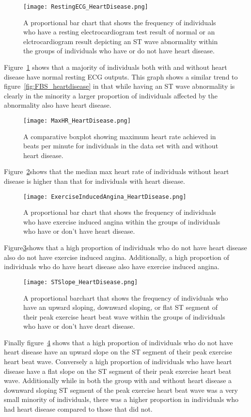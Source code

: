 \documentclass[12pt]{article}
\begin{document}
\begin{figure}[tbp]
  \centering
  \texttt{[image: RestingECG\_HeartDisease.png]}
  \caption{A proportional bar chart that shows the frequency of individuals who have a resting electrocardiogram test result of normal or an elctrocardiogram result depicting an ST wave abnormality within the groups of individuals who have or do not have heart disease.}
  \label{fig:ECG_heartdisease}
\end{figure}
Figure~\ref*{fig:ECG_heartdisease} shows that a majority of individuals both with and without heart disease have normal resting ECG outputs. This graph shows a similar trend to figure~\ref*{fig:FBS_heartdisease} in that while having an ST wave abnormality is clearly in the minority a larger proportion of individuals affected by the abnormality also have heart disease.
\begin{figure}[tbp]
  \centering
  \texttt{[image: MaxHR\_HeartDisease.png]}
  \caption{A comparative boxplot showing maximum heart rate achieved in beats per minute for individuals in the data set with and without heart disease.}
  \label{fig:maxHR_heartdisease}
\end{figure}
Figure~\ref*{fig:maxHR_heartdisease}shows that the median max heart rate of individuals without heart disease is higher than that for individuals with heart disease. 
\begin{figure}[tbp]
  \centering
  \texttt{[image: ExerciseInducedAngina\_HeartDisease.png]}
  \caption{A proportional bar chart that shows the frequency of individuals who have exercise induced angina within the groups of individuals who have or don't have heart disease.}
  \label{fig:EIA_heartdisease}
\end{figure}
Figure\ref*{fig:EIA_heartdisease}shows that a high proportion of individuals who do not have heart disease also do not have exercise induced angina. Additionally, a high proportion of individuals who do have heart disease also have exercise induced angina. 
\begin{figure}[tbp]
  \centering
  \texttt{[image: STSlope\_HeartDisease.png]}
  \caption{A proportional barchart that shows the frequency of individuals who have an upward sloping, downward sloping, or flat ST segment of their peak exercise heart beat wave within the groups of individuals who have or don't have deart disease.}
  \label{fig:STslope_heartdisease}
\end{figure}
Finally figure~\ref*{fig:STslope_heartdisease} shows that a high proportion of individuals who do not have heart disease have an upward slope on the ST segment of their peak exercise heart beat wave. Conversely a high proportion of individuals who have heart disease have a flat slope on the ST segment of their peak exercise heart beat wave. Additionally while in both the group with and without heart disease a downward sloping ST segment of the peak exercise heart beat wave was a very small minority of individuals, there was a higher proportion in individuals who had heart disease compared to those that did not. \par 
\end{document}
